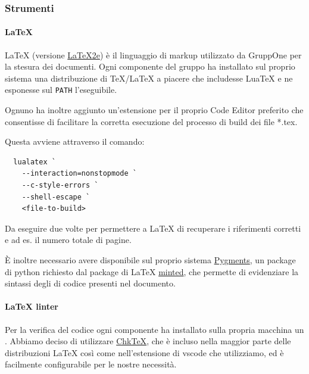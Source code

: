 \documentclass[../norme-di-progetto.tex]{subfiles}
\begin{document}
\subsubsection{Strumenti}

\paragraph{\LaTeX}%
\label{par:LaTeX}
\LaTeX{} (versione \href{https://texfaq.org/FAQ-latex2e}{\LaTeX2e}) è il linguaggio di markup utilizzato da GruppOne per la stesura dei documenti.
Ogni componente del gruppo ha installato sul proprio sistema una distribuzione di \TeX{}/\LaTeX{} a piacere che includesse Lua\TeX{} e ne esponesse sul \verb|PATH| l'eseguibile.

Ognuno ha inoltre aggiunto un'estensione per il proprio Code Editor preferito che consentisse di facilitare la corretta esecuzione del processo di build dei file *.tex.

Questa avviene attraverso il comando:

\begin{verbatim}
  lualatex `
    --interaction=nonstopmode `
    --c-style-errors `
    --shell-escape `
    <file-to-build>
\end{verbatim}

Da eseguire due volte per permettere a \LaTeX{} di recuperare i riferimenti corretti e ad es\@. il numero totale di pagine.

È inoltre necessario avere disponibile sul proprio sistema \href{https://pygments.org/}{Pygments}, un package di python richiesto dal package di \LaTeX{} \href{https://ctan.org/pkg/minted?lang=en}{minted}, che permette di evidenziare la sintassi degli  di codice presenti nel documento.

\paragraph{\LaTeX{} linter}%
\label{par:latex_linter}

Per la verifica del codice ogni componente ha installato sulla propria macchina un .
Abbiamo deciso di utilizzare \href{https://www.nongnu.org/chktex/}{Chk\TeX}, che è incluso nella maggior parte delle distribuzioni \LaTeX{} così come nell'estensione di vscode che utilizziamo, ed è facilmente configurabile per le nostre necessità.
\end{document}
